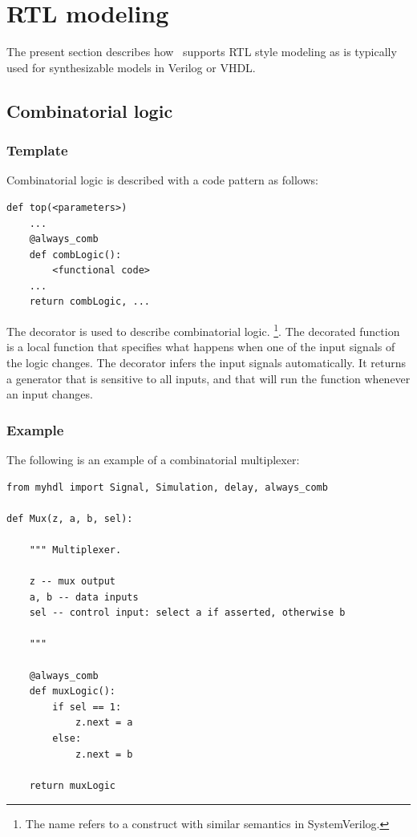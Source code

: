 \section{RTL modeling \label{model-rtl}}

The present section describes how \myhdl\ supports RTL style modeling
as is typically used for synthesizable models in Verilog or VHDL. 

\subsection{Combinatorial logic \label{model-comb}}

\subsubsection{Template \label{model-comb-templ}}
 
Combinatorial logic is described with a code pattern as
follows: 

\begin{verbatim}
def top(<parameters>)
    ...
    @always_comb
    def combLogic():
        <functional code>
    ...
    return combLogic, ...
\end{verbatim}

The  decorator is used to describe
combinatorial logic.
\footnote{The name  refers to a construct with
similar semantics in SystemVerilog.}.
The decorated function is a local function that specifies what
happens when one of the input signals of the logic changes.  The
 decorator infers the input signals
automatically. It returns a generator that is sensitive to all inputs,
and that will run the function whenever an input changes.


\subsubsection{Example \label{model-comb-ex}}

The following is an example of a combinatorial multiplexer:

\begin{verbatim}
from myhdl import Signal, Simulation, delay, always_comb

def Mux(z, a, b, sel):

    """ Multiplexer.
    
    z -- mux output
    a, b -- data inputs
    sel -- control input: select a if asserted, otherwise b

    """

    @always_comb
    def muxLogic():
        if sel == 1:
            z.next = a
        else:
            z.next = b

    return muxLogic
\end{verbatim}


